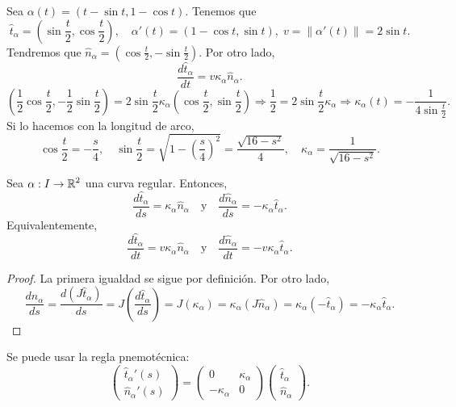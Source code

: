 \begin{eg}[Cicloide]
Sea $\displaystyle \alpha\left(t\right)=\left(t-\sin t, 1-\cos t\right) $. Tenemos que 
\[\hat{t}_{\alpha }=\left(\sin \frac{t}{2}, \cos \frac{t}{2}\right), \quad \alpha'\left(t\right)=\left(1-\cos t, \sin t\right), \; v = \|\alpha'\left(t\right)\| = 2 \sin t .\]
Tendremos que $\displaystyle \hat{n}_{\alpha }=\left(\cos \frac{t}{2}, -\sin \frac{t}{2}\right) $. Por otro lado, 
\[\frac{d\hat{t}_{\alpha }}{dt}=v\kappa_{\alpha}\hat{n}_{\alpha} .\]
\[\left(\frac{1}{2}\cos\frac{t}{2}, -\frac{1}{2}\sin \frac{t}{2}\right)=2\sin \frac{t}{2}\kappa_{\alpha }\left(\cos \frac{t}{2}, \sin \frac{t}{2}\right) \Rightarrow \frac{1}{2} = 2\sin \frac{t}{2}\kappa_{\alpha } \Rightarrow \kappa_{\alpha }\left(t\right)=-\frac{1}{4\sin \frac{t}{2}} .\]
Si lo hacemos con la longitud de arco, 
\[\cos \frac{t}{2} = - \frac{s}{4}, \quad \sin \frac{t}{2} = \sqrt{1-\left(\frac{s}{4}\right)^{2}} = \frac{\sqrt{16-s^{2}}}{4}, \quad \kappa_{\alpha }=\frac{1}{\sqrt{16-s^{2}}} .\]
\end{eg}
\begin{theorem}
	Sea $\displaystyle \alpha : I \to \mathbb{R}^{2} $ una curva regular. Entonces, 
\[\frac{d\hat{t}_{\alpha }}{d s}= \kappa_{\alpha }\hat{n}_{\alpha} \quad \text{y} \quad
\frac{d\hat{n}_{\alpha }}{d s}= -\kappa_{\alpha }\hat{t}_{\alpha} .\]
Equivalentemente, 
\[\frac{d\hat{t}_{\alpha }}{dt}= v\kappa_{\alpha }\hat{n}_{\alpha } \quad \text{y} \quad \frac{d\hat{n}_{\alpha }}{dt}= - v\kappa_{\alpha }\hat{t}_{\alpha } .\]
\end{theorem}
\begin{proof}
La primera igualdad se sigue por definición. Por otro lado, 
\[\frac{d\hat{n}_{\alpha }}{d s}= \frac{d\left(J\hat{t}_{\alpha }\right)}{d s}=J\left(\frac{d\hat{t}_{\alpha }}{d s}\right) =J\left(\kappa_{\alpha }\right)=\kappa_{\alpha }\left(J\hat{n}_{\alpha }\right) =\kappa_{\alpha }\left(-\hat{t}_{\alpha }\right)=-\kappa_{\alpha }\hat{t}_{\alpha}.\]
\end{proof}

\begin{observation}
Se puede usar la regla pnemotécnica:
\[\begin{pmatrix} \hat{t}_{\alpha }'\left(s\right) \\ \hat{n}_{\alpha }'\left(s\right) \end{pmatrix}=\begin{pmatrix} 0 & \kappa_{\alpha } \\-\kappa_{\alpha } & 0 \end{pmatrix}\begin{pmatrix} \hat{t}_{\alpha }\\\hat{n}_{\alpha } \end{pmatrix} .\]
\end{observation}

